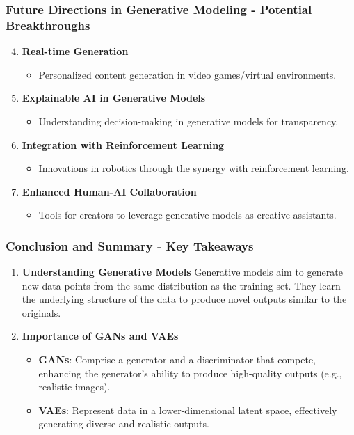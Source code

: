 \documentclass[aspectratio=169]{beamer}
\begin{document}
\begin{frame}[fragile]
    \frametitle{Future Directions in Generative Modeling - Potential Breakthroughs}
    \begin{enumerate}
        \setcounter{enumi}{3} %
        \item \textbf{Real-time Generation}
            \begin{itemize}
                \item Personalized content generation in video games/virtual environments.
            \end{itemize}

        \item \textbf{Explainable AI in Generative Models}
            \begin{itemize}
                \item Understanding decision-making in generative models for transparency.
            \end{itemize}

        \item \textbf{Integration with Reinforcement Learning}
            \begin{itemize}
                \item Innovations in robotics through the synergy with reinforcement learning.
            \end{itemize}

        \item \textbf{Enhanced Human-AI Collaboration}
            \begin{itemize}
                \item Tools for creators to leverage generative models as creative assistants.
            \end{itemize}
    \end{enumerate}
\end{frame}

\begin{frame}[fragile]
    \frametitle{Conclusion and Summary - Key Takeaways}
    \begin{enumerate}
        \item \textbf{Understanding Generative Models}  
            Generative models aim to generate new data points from the same distribution as the training set. They learn the underlying structure of the data to produce novel outputs similar to the originals.

        \item \textbf{Importance of GANs and VAEs}
            \begin{itemize}
                \item \textbf{GANs}: Comprise a generator and a discriminator that compete, enhancing the generator's ability to produce high-quality outputs (e.g., realistic images).
                \item \textbf{VAEs}: Represent data in a lower-dimensional latent space, effectively generating diverse and realistic outputs.
            \end{itemize}
    \end{enumerate}
\end{frame}
\end{document}
